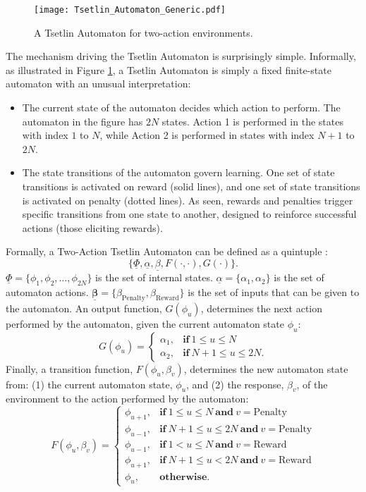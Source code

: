 \documentclass[11pt,a4paper]{article}
\begin{document}
\begin{figure}[!ht]
\centering
\texttt{[image: Tsetlin\_Automaton\_Generic.pdf]}
\caption{A Tsetlin Automaton for two-action environments.}
\label{figure:tsetlin_automaton}
\end{figure}
The mechanism driving the Tsetlin Automaton is surprisingly simple. Informally, as illustrated in Figure \ref{figure:tsetlin_automaton}, a Tsetlin Automaton is simply a fixed finite-state automaton \cite{Carroll1989} with an unusual interpretation:
\begin{itemize}
\item The current state of the automaton decides which action to perform. The automaton in the figure has $2N$ states. Action 1 is performed in the states with index $1$ to $N$, while Action 2 is performed in states with index $N+1$ to $2N$.
\item The state transitions of the automaton govern learning. One set of state transitions is activated on reward (solid lines), and one set of state transitions is activated on penalty (dotted lines). As seen, rewards and penalties trigger specific transitions from one state to another, designed to reinforce successful actions (those eliciting rewards). 
\end{itemize}
Formally, a Two-Action Tsetlin Automaton can be defined as a quintuple \cite{Narendra1989}:
\[
\{\underline{\Phi}, \underline{\alpha}, \underline{\beta}, F(\cdot,\cdot), G(\cdot)\}.
\]
$\underline{\Phi} = \{\phi_1, \phi_2, …, \phi_{2N}\}$ is the set of internal states. $\underline{\alpha} = \{\alpha_1, \alpha_2\}$ is the set of automaton actions. $\mathbf{\underline{\beta}} = \{\beta_{\mathrm{Penalty}}, \beta_{\mathrm{Reward}}\}$ is the set of inputs that can be given to the automaton.
An output function, $G(\phi_u)$, determines the next action performed by the automaton, 
given the current automaton state $\phi_u$: 
\[G(\phi_u) = \begin{cases}
       \alpha_1, & \mathbf{if}~ 1 \le u \le N\\
       \alpha_2, & \mathbf{if}~ N+1 \le u \le 2N.
     \end{cases}
\]
Finally, a transition function, $F(\phi_u, \beta_v)$, determines the new automaton state from: (1) the current automaton state, $\phi_u$,  and (2) the response, $\beta_v$, of the environment to the action performed by the automaton: 
\[F(\phi_u, \beta_v) = \begin{cases}
     \phi_{u+1},& \mathbf{if}~ 1 \le u \le N ~\mathbf{and}~ v = \text{Penalty}\\
     \phi_{u-1},& \mathbf{if}~ N+1 \le u \le 2N ~\mathbf{and}~ v = \text{Penalty}\\
     \phi_{u-1},& \mathbf{if}~ 1 < u \le N ~\mathbf{and}~ v = \text{Reward}\\
     \phi_{u+1},& \mathbf{if}~ N+1 \le u < 2N ~\mathbf{and}~ v = \text{Reward}\\
     \phi_{u},& \mathbf{otherwise}.
     \end{cases}
\]
\end{document}
